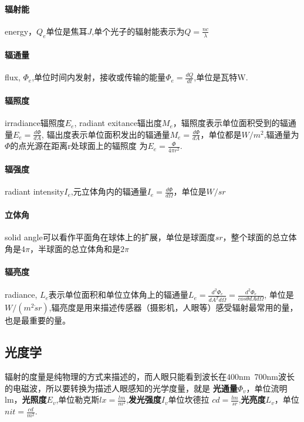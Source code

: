 \paragraph{辐射能}
energy，$Q_{e}$单位是焦耳$J$,单个光子的辐射能表示为$Q=\frac{nc}{\lambda}$

\paragraph{辐通量}
flux, $\Phi_{e}$,单位时间内发射，接收或传输的能量$\Phi_{e}=\frac{dQ}{dt}$,单位是瓦特W.

\paragraph{辐照度}
irradiance辐照度$E_{e}$, radiant exitance辐出度$M_{e}$，辐照度表示单位面积受到的辐通量$E_{e}=\frac{d\Phi}{dA}$, 
辐出度表示单位面积发出的辐通量$M_{e}=\frac{d\Phi}{dA}$，单位都是$W/m^{2}$,辐通量为$\Phi$的点光源在距离r处球面上的辐照度
为$E_{e}=\frac{\Phi}{4 \pi r^{2}}$.

\paragraph{辐强度}
radiant intensity$I_{e}$,元立体角内的辐通量$I_{e}=\frac{d\Phi}{d\Omega}$，单位是$W/sr$

\paragraph{立体角}
solid angle可以看作平面角在球体上的扩展，单位是球面度$sr$，整个球面的总立体角是$4\pi$，半球面的总立体角和是$2\pi$

\paragraph{辐亮度}
radiance, $L_{e}$表示单位面积和单位立体角上的辐通量$L_{e}=\frac{d^{2}\Phi_{e}}{dA^{T}d\Omega}=\frac{d^{2}\Phi_{e}}{cos\theta dA d\Omega}$,
单位是$W/(m^{2}\dot sr)$,辐亮度是用来描述传感器（摄影机，人眼等）感受辐射最常用的量，也是最重要的量。

\subsection{光度学}

辐射的度量是纯物理的方式来描述的，而人眼只能看到波长在400nm~700nm波长的电磁波，所以要转换为描述人眼感知的光学度量，就是
\textbf{光通量}$\Phi_{v}$，单位流明lm，\textbf{光照度}$E_{v}$,单位勒克斯$lx=\frac{lm}{m^2}$,\textbf{发光强度}$I_{v}$单位坎德拉
$cd=\frac{lm}{sr}$,\textbf{光亮度}$L_{v}$，单位$nit=\frac{cd}{m^2}$.

